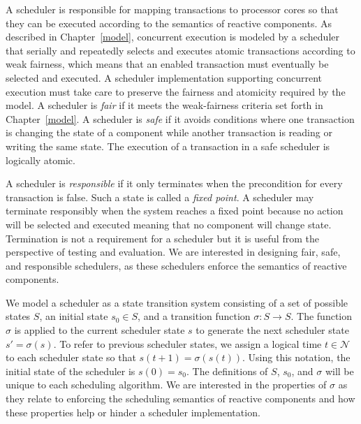 A scheduler is responsible for mapping transactions to processor cores so that they can be executed according to the semantics of reactive components.
As described in Chapter~\ref{model}, concurrent execution is modeled by a scheduler that serially and repeatedly selects and executes atomic transactions according to weak fairness, which means that an enabled transaction must eventually be selected and executed.
A scheduler implementation supporting concurrent execution must take care to preserve the fairness and atomicity required by the model.
A scheduler is \emph{fair} if it meets the weak-fairness criteria set forth in Chapter~\ref{model}.
A scheduler is \emph{safe} if it avoids conditions where one transaction is changing the state of a component while another transaction is reading or writing the same state.
The execution of a transaction in a safe scheduler is logically atomic.

A scheduler is \emph{responsible} if it only terminates when the precondition for every transaction is false.
Such a state is called a \emph{fixed point}.
A scheduler may terminate responsibly when the system reaches a fixed point because no action will be selected and executed meaning that no component will change state.
Termination is not a requirement for a scheduler but it is useful from the perspective of testing and evaluation.
We are interested in designing fair, safe, and responsible schedulers, as these schedulers enforce the semantics of reactive components.

We model a scheduler as a state transition system consisting of a set of possible states $S$, an initial state $s_0 \in S$, and a transition function $\sigma: S \to S$.
The function $\sigma$ is applied to the current scheduler state $s$ to generate the next scheduler state $s' = \sigma (s)$.
To refer to previous scheduler states, we assign a logical time $t \in \mathcal{N}$ to each scheduler state so that $s(t + 1) = \sigma (s(t))$.
Using this notation, the initial state of the scheduler is $s(0) = s_0$.
The definitions of $S$, $s_0$, and $\sigma$ will be unique to each scheduling algorithm.
We are interested in the properties of $\sigma$ as they relate to enforcing the scheduling semantics of reactive components and how these properties help or hinder a scheduler implementation.

